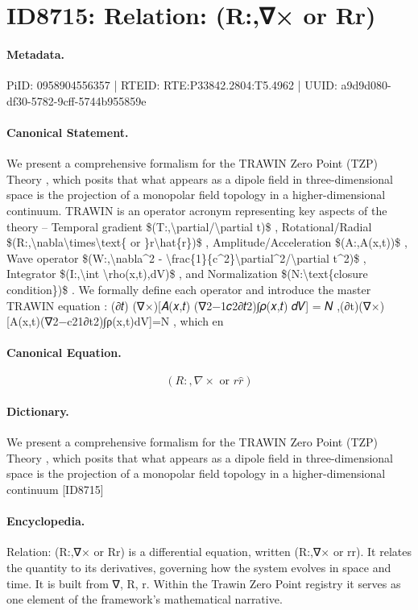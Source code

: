 \section*{ID8715: Relation: (R:,∇× or Rr)}
\paragraph{Metadata.}
PiID: 0958904556357 | RTEID: RTE:P33842.2804:T5.4962 | UUID: a9d9d080-df30-5782-9cff-5744b955859e

\paragraph{Canonical Statement.}
We present a comprehensive formalism for the TRAWIN Zero Point (TZP) Theory , which posits that what appears as a dipole field in three-dimensional space is the projection of a monopolar field topology in a higher-dimensional continuum. TRAWIN is an operator acronym representing key aspects of the theory – Temporal gradient \$(T:,\textbackslash{}partial/\textbackslash{}partial t)\$ , Rotational/Radial \$(R:,\textbackslash{}nabla\textbackslash{}times\textbackslash{}text\{ or \}r\textbackslash{}hat\{r\})\$ , Amplitude/Acceleration \$(A:,A(x,t))\$ , Wave operator \$(W:,\textbackslash{}nabla\textasciicircum{}2 - \textbackslash{}frac\{1\}\{c\textasciicircum{}2\}\textbackslash{}partial\textasciicircum{}2/\textbackslash{}partial t\textasciicircum{}2)\$ , Integrator \$(I:,\textbackslash{}int \textbackslash{}rho(x,t),dV)\$ , and Normalization \$(N:\textbackslash{}text\{closure condition\})\$ . We formally define each operator and introduce the master TRAWIN equation : (∂𝑡) (∇×)[𝐴(𝑥,𝑡) (∇2−1𝑐2∂𝑡2)∫𝜌(𝑥,𝑡) 𝑑𝑉] = 𝑁 ,(∂t​)(∇×)[A(x,t)(∇2−c21​∂t2​)∫ρ(x,t)dV]=N , which en

\paragraph{Canonical Equation.}
\[
(R:,\nabla\times\text{ or }r\hat{r})
\]

\paragraph{Dictionary.}
We present a comprehensive formalism for the TRAWIN Zero Point (TZP) Theory , which posits that what appears as a dipole field in three-dimensional space is the projection of a monopolar field topology in a higher-dimensional continuum [ID8715]

\paragraph{Encyclopedia.}
Relation: (R:,∇× or Rr) is a differential equation, written (R:,∇× or rr). It relates the quantity to its derivatives, governing how the system evolves in space and time. It is built from ∇, R, r. Within the Trawin Zero Point registry it serves as one element of the framework's mathematical narrative.
